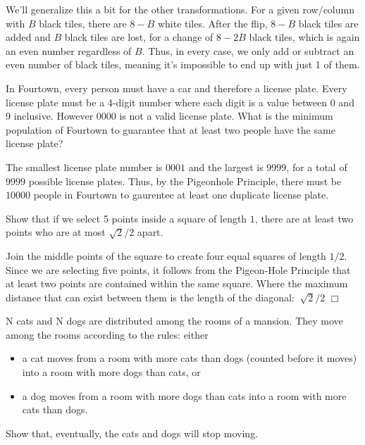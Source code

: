 \begin{solution}
    We'll generalize this a bit for the other transformations. For a given row/column with $B$ black tiles, there are $8-B$ white tiles. After the flip, $8-B$ black tiles are added and $B$ black tiles are lost, for a change of $8-2B$ black tiles, which is again an even number regardless of $B$. Thus, in every case, we only add or subtract an even number of black tiles, meaning it's impossible to end up with just 1 of them.
\end{solution}

\begin{problem}
    In Fourtown, every person must have a car and therefore a license plate. Every license plate must be a 4-digit number where each digit is a value between 0 and 9 inclusive. However 0000 is not a valid license plate. What is the minimum population of Fourtown to guarantee that at least two people have the same license plate?
\end{problem}

\begin{solution}
    The smallest license plate number is $0001$ and the largest is $9999$, for a total of $9999$ possible license plates. Thus, by the Pigeonhole Principle, there must be $\boxed{10000}$ people in Fourtown to gaurentee at least one duplicate license plate.
\end{solution}


\begin{problem}[C][3]
    Show that if we select 5 points inside a square of length $1$, there are at least two points who are at most $\sqrt{2}/2$ apart.
\end{problem}

\begin{solution}
    Join the middle points of the square to create four equal squares of length $1/2$. Since we are selecting five points, it follows from the Pigeon-Hole Principle that at least two points are contained within the same square. Where the maximum distance that can exist between them is the length of the diagonal: $\ \sqrt 2 / 2$ $\Box$
\end{solution}

\begin{problem}
    N cats and N dogs are distributed among the rooms of a mansion. They move among the rooms according to the rules: either  

    {\raggedright\begin{itemize}[topsep=2mm, itemsep=1mm]
        \item a cat moves from a room with more cats than dogs (counted before it moves) into a room with more dogs than cats, or  
        \item a dog moves from a room with more dogs than cats into a room with more cats than dogs.
    \end{itemize}}

    Show that, eventually, the cats and dogs will stop moving. 
\end{problem}

